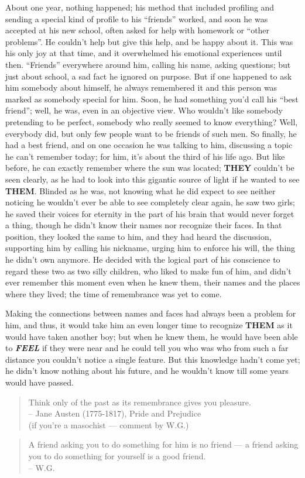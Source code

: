 About one year, nothing happened; his method that included profiling and sending a special kind of profile to his \enquote{friends} worked, and soon he was accepted at his new school, often asked for help with homework or \enquote{other problems}. He couldn't help but give this help, and be happy about it. This was his only joy at that time, and it overwhelmed his emotional experiences until then. \enquote{Friends} everywhere around him, calling his name, asking questions; but just about school, a sad fact he ignored on purpose. But if one happened to ask him somebody about himself, he always remembered it and this person was marked as somebody special for him. Soon, he had something you'd call his \enquote{best friend}; well, he was, even in an objective view. Who wouldn't like somebody pretending to be perfect, somebody who really seemed to know everything? Well, everybody did, but only few people want to be friends of such men. So finally, he had a best friend, and on one occasion he was talking to him, discussing a topic he can't remember today; for him, it's about the third of his life ago. But like before, he can exactly remember where the sun was located; \textbf{THEY} couldn't be seen clearly, as he had to look into this gigantic source of light if he wanted to see \textbf{THEM}. Blinded as he was, not knowing what he did expect to see neither noticing he wouldn't ever be able to see completely clear again, he saw two girls; he saved their voices for eternity in the part of his brain that would never forget a thing, though he didn't know their names nor recognize their faces. In that position, they looked the same to him, and they had heard the discussion, supporting him by calling his nickname, urging him to enforce his will, the thing he didn't own anymore. He decided with the logical part of his conscience to regard these two as two silly children, who liked to make fun of him, and didn't ever remember this moment even when he knew them, their names and the places where they lived; the time of remembrance was yet to come.

Making the connections between names and faces had always been a problem for him, and thus, it would take him an even longer time to recognize \textbf{THEM} as it would have taken another boy; but when he knew them, he would have been able to \emph{\textbf{FEEL}} if they were near and he could tell you who was who from such a far distance you couldn't notice a single feature. But this knowledge hadn't come yet; he didn't know nothing about his future, and he wouldn't know till some years would have passed. 

\begin{quote}
Think only of the past as its remembrance gives you pleasure.\\
-- Jane Austen (1775-1817), Pride and Prejudice\\
(if you're a masochist --- comment by W.G.)  
\end{quote}

\begin{quote}
A friend asking you to do something for him is no friend --- a friend asking you to do something for yourself is a good friend.\\
-- W.G.
\end{quote}
